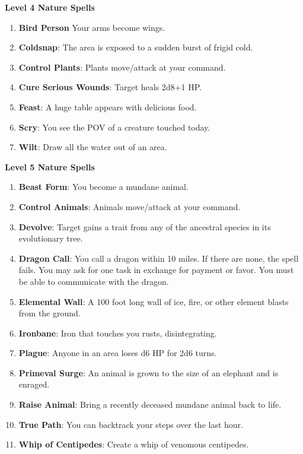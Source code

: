 \documentclass[twoside]{article}
\begin{document}
\textbf{Level 4 Nature Spells}
\begin{enumerate}[nosep]
\item \textbf{Bird Person} Your arms become wings. 
\item \textbf{Coldsnap}: The area is exposed to a sudden burst of frigid cold.
\item \textbf{Control Plants}: Plants move/attack at your command.
\item \textbf{Cure Serious Wounds}: Target heals 2d8+1 HP.
\item \textbf{Feast}: A huge table appears with delicious food.
\item \textbf{Scry}: You see the POV of a creature touched today.
\item \textbf{Wilt}: Draw all the water out of an area.
\end{enumerate}

\textbf{Level 5 Nature Spells}
\begin{enumerate}[nosep]
\item \textbf{Beast Form}: You become a mundane animal.
\item \textbf{Control Animals}: Animals move/attack at your command.
\item \textbf{Devolve}: Target gains a trait from any of the ancestral species in its evolutionary tree.
\item \textbf{Dragon Call}: You call a dragon within 10 miles. If there are none, the spell fails. You may ask for one task in exchange for payment or favor. You must be able to communicate with the dragon.
\item \textbf{Elemental Wall}: A 100 foot long wall of ice, fire, or other element blasts from the ground.
\item \textbf{Ironbane}: Iron that touches you rusts, disintegrating.
\item \textbf{Plague}: Anyone in an area loses d6 HP for 2d6 turns.
\item \textbf{Primeval Surge}: An animal is grown to the size of an elephant and is enraged.
\item \textbf{Raise Animal}: Bring a recently deceased mundane animal back to life.
\item \textbf{True Path}: You can backtrack your steps over the last hour.
\item \textbf{Whip of Centipedes}: Create a whip of venomous centipedes.
\end{enumerate}
\end{document}
